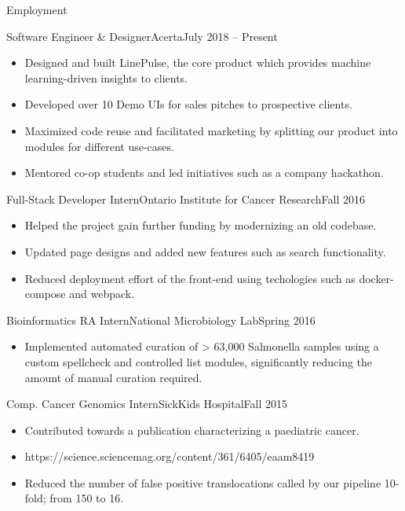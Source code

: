 \documentclass[]{mcdowellcv}
\begin{document}
	\makeheader
	
	\begin{cvsection}{Employment}
		\begin{cvsubsection}{Software Engineer \& Designer}{Acerta}{July 2018 -- Present}
			\begin{itemize}
				\item Designed and built LinePulse, the core product which provides machine learning-driven insights to clients.
				\item Developed over 10 Demo UIs for sales pitches to prospective clients.
				\item Maximized code reuse and facilitated marketing by splitting our product into modules for different use-cases.
				\item Mentored co-op students and led initiatives such as a company hackathon.
			\end{itemize}
		\end{cvsubsection}
		
		\begin{cvsubsection}{Full-Stack Developer Intern}{Ontario Institute for Cancer Research}{Fall 2016}	
			\begin{itemize}
				\item Helped the project gain further funding by modernizing an old codebase.
				\item Updated page designs and added new features such as search functionality.
				\item Reduced deployment effort of the front-end using techologies such as docker-compose and webpack.
			\end{itemize}
		\end{cvsubsection}
		
		\begin{cvsubsection}{Bioinformatics RA Intern}{National Microbiology Lab}{Spring 2016}		
			\begin{itemize}
				\item Implemented automated curation of > 63,000 Salmonella samples using a custom spellcheck and controlled list modules, significantly reducing the amount of manual curation required.
			\end{itemize}
		\end{cvsubsection}
		
		\begin{cvsubsection}{Comp. Cancer Genomics Intern}{SickKids Hospital}{Fall 2015}
			\begin{itemize}
				\item Contributed towards a publication characterizing a paediatric cancer.
				\item https://science.sciencemag.org/content/361/6405/eaam8419	
				\item Reduced the number of false positive translocations called by our pipeline 10-fold; from 150 to 16.
			\end{itemize}
		\end{cvsubsection}
	\end{cvsection}
	
\end{document}
